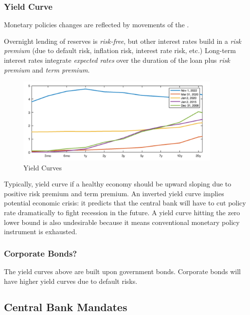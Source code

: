         \subsubsection{Yield Curve}
            Monetary policies changes are reflected by movements of the . 
            
            Overnight lending of reserves is \emph{risk-free}, but other interest rates build in a \emph{risk premium} (due to default risk, inflation risk, interest rate risk, etc.) Long-term interest rates integrate \emph{expected rates} over the duration of the loan plus \emph{risk premium} and \emph{term premium}.

            \begin{figure}[H]
                \centering
                \includegraphics[width=4in]{images/ch7/yield curve.png}
                \caption{Yield Curves}
            \end{figure}

            Typically, yield curve if a healthy economy should be upward sloping due to positive risk premium and term premium. An inverted yield curve implies potential economic crisis: it predicts that the central bank will have to cut policy rate dramatically to fight recession in the future. A yield curve hitting the zero lower bound is also undesirable because it means conventional monetary policy instrument is exhausted.

         \subsubsection{Corporate Bonds?}
            The yield curves above are built upon government bonds. Corporate bonds will have higher yield curves due to default risks.
        
    \subsection{Central Bank Mandates}
    
